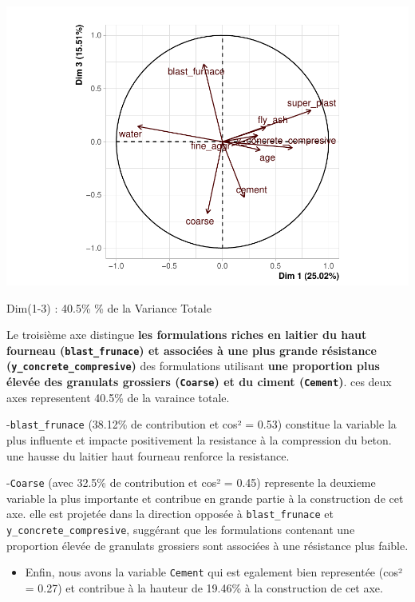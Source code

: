 \documentclass[
  12pt,
]{article}
\providecommand{\tightlist}{%
  \setlength{\itemsep}{0pt}\setlength{\parskip}{0pt}}
\begin{document}
\begin{center}\includegraphics{rmd_final_files/figure-latex/unnamed-chunk-34-1} \end{center}

Dim(1-3) : 40.5\% \% de la Variance Totale

Le troisième axe distingue \textbf{les formulations riches en laitier du
haut fourneau (\texttt{blast\_frunace}) et associées à une plus grande
résistance (\texttt{y\_concrete\_compresive})} des formulations
utilisant \textbf{une proportion plus élevée des granulats grossiers
(\texttt{Coarse}) et du ciment (\texttt{Cement})}. ces deux axes
representent 40.5\% de la varaince totale.

-\texttt{blast\_frunace} (38.12\% de contribution et cos² = 0.53)
constitue la variable la plus influente et impacte positivement la
resistance à la compression du beton. une hausse du laitier haut
fourneau renforce la resistance.

-\texttt{Coarse} (avec 32.5\% de contribution et cos² = 0.45) represente
la deuxieme variable la plus importante et contribue en grande partie à
la construction de cet axe. elle est projetée dans la direction opposée
à \texttt{blast\_frunace} et \texttt{y\_concrete\_compresive}, suggérant
que les formulations contenant une proportion élevée de granulats
grossiers sont associées à une résistance plus faible.

\begin{itemize}
\tightlist
\item
  Enfin, nous avons la variable \texttt{Cement} qui est egalement bien
  representée (cos² = 0.27) et contribue à la hauteur de 19.46\% à la
  construction de cet axe.
\end{itemize}
\end{document}
